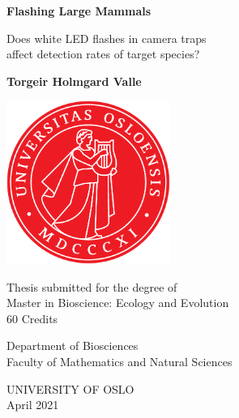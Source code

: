 \begin{titlepage}
   \begin{center}
       \vspace*{1cm}

		\Huge
       \textbf{Flashing Large Mammals}

       \vspace{0.5cm}
       \LARGE
        Does white LED flashes in camera traps \\
        affect detection rates of target species?
            
       \vspace{1cm}

       \textbf{Torgeir Holmgard Valle}

       \vfill
     
       \includegraphics[width=0.4\textwidth]{img/UiO_logo.png}
       
       \vspace{2.9cm}
            
       \Large
       Thesis submitted for the degree of \\
       Master in Bioscience: Ecology and Evolution \\
       60 Credits
            
       \vspace{0.4cm}
       
       Department of Biosciences\\
       Faculty of Mathematics and Natural Sciences\\
       
       \vspace{0.4cm}
       
       UNIVERSITY OF OSLO\\
       
       \vspace{0.4cm}
		April 2021
            
   \end{center}
\end{titlepage}